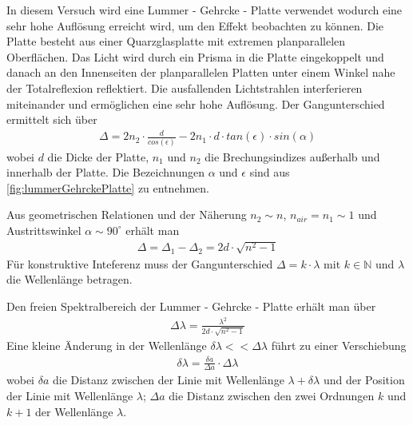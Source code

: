     In diesem Versuch wird eine Lummer - Gehrcke - Platte verwendet wodurch eine sehr hohe Auflösung erreicht wird, um den Effekt beobachten zu können. Die Platte besteht aus einer Quarzglasplatte mit extremen planparallelen Oberflächen. Das Licht wird durch ein Prisma in die Platte eingekoppelt und danach an den Innenseiten der planparallelen Platten unter einem Winkel nahe der Totalreflexion reflektiert. Die ausfallenden Lichtstrahlen interferieren miteinander und ermöglichen eine sehr hohe Auflösung. Der Gangunterschied ermittelt sich über
    \begin{align}
    	\Delta = 2n_2 \cdot \frac{d}{cos(\epsilon)} - 2n_1 \cdot d \cdot tan(\epsilon) \cdot sin(\alpha)
    \end{align}
    wobei $d$ die Dicke der Platte, $n_1$ und $n_2$ die Brechungsindizes außerhalb und innerhalb der Platte. Die Bezeichnungen $\alpha$ und $\epsilon$ sind aus \autoref{fig:lummerGehrckePlatte} zu entnehmen.

    Aus geometrischen Relationen und der Näherung $n_2 \sim n$, $n_{air} = n_1 \sim 1$ und Austrittswinkel $\alpha \sim 90^\circ$ erhält man
    \begin{align}
    	\Delta = \Delta_1 - \Delta_2 = 2d \cdot \sqrt{n^2 - 1}
    \end{align}
    Für konstruktive Inteferenz muss der Gangunterschied $\Delta = k \cdot \lambda$ mit $k \in \mathbb{N} $ und $\lambda$ die Wellenlänge betragen.

    Den freien Spektralbereich der Lummer - Gehrcke - Platte erhält man über
    \begin{align}
    	\Delta \lambda = \frac{\lambda^2}{2d \cdot \sqrt{n^2 - 1}}
    \end{align}
    Eine kleine Änderung in der Wellenlänge $\delta \lambda << \Delta \lambda$ führt zu einer Verschiebung
    \begin{align}
    	\delta \lambda = \frac{\delta a}{\Delta a} \cdot \Delta \lambda
    \end{align}
    wobei $\delta a$ die Distanz zwischen der Linie mit Wellenlänge $\lambda + \delta \lambda$ und der Position der Linie mit Wellenlänge $\lambda$; $\Delta a$ die Distanz zwischen den zwei Ordnungen $k$ und $k + 1$ der Wellenlänge $\lambda$.

